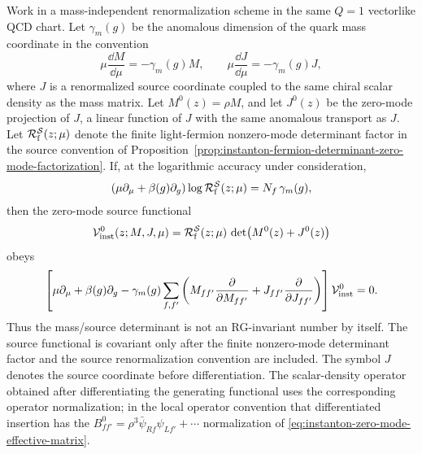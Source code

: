 \begin{proposition}
\label{prop:instanton-mass-source-rg-transport}
Work in a mass-independent renormalization scheme in the same \(Q=1\)
vectorlike QCD chart.  Let \(\gamma_m(g)\) be the anomalous dimension of the
quark mass coordinate in the convention
\begin{equation}
  \mu\frac{\dd M}{\dd\mu}=-\gamma_m(g)M,
  \qquad
  \mu\frac{\dd J}{\dd\mu}=-\gamma_m(g)J,
  \label{eq:instanton-mass-source-running}
\end{equation}
where \(J\) is a renormalized source coordinate coupled to the same chiral
scalar density as the mass matrix.  Let \(M^0(z)=\rho M\), and let
\(J^0(z)\) be the zero-mode projection of \(J\), a linear function of \(J\)
with the same anomalous transport as \(J\).  Let
\(\mathcal R_{\rm f}^{\mathcal S}(z;\mu)\) denote the finite light-fermion
nonzero-mode determinant factor in the source convention of
Proposition~\ref{prop:instanton-fermion-determinant-zero-mode-factorization}.
If, at the logarithmic accuracy under consideration,
\begin{equation}
  \left(\mu\partial_\mu+\beta(g)\partial_g\right)
  \log \mathcal R_{\rm f}^{\mathcal S}(z;\mu)
  =
  N_f\,\gamma_m(g),
  \label{eq:instanton-fermion-factor-mass-anomalous-rge}
\end{equation}
then the zero-mode source functional
\begin{equation}
  \mathcal V_{\rm inst}^{0}(z;M,J,\mu)
  =
  \mathcal R_{\rm f}^{\mathcal S}(z;\mu)\,
  \det\!\left(M^0(z)+J^0(z)\right)
  \label{eq:instanton-renormalized-source-functional}
\end{equation}
obeys
\begin{equation}
  \left[
    \mu\partial_\mu+\beta(g)\partial_g
    -\gamma_m(g)
    \sum_{f,f'}
    \left(
      M_{ff'}\frac{\partial}{\partial M_{ff'}}
      +J_{ff'}\frac{\partial}{\partial J_{ff'}}
    \right)
  \right]
  \mathcal V_{\rm inst}^{0}
  =
  0 .
  \label{eq:instanton-source-functional-rge}
\end{equation}
Thus the mass/source determinant is not an RG-invariant number by itself.
The source functional is covariant only after the finite nonzero-mode
determinant factor and the source renormalization convention are included.
The symbol \(J\) denotes the source coordinate before differentiation.  The
scalar-density operator obtained after differentiating the generating
functional uses the corresponding operator normalization; in the local
operator convention that differentiated insertion has the
\(B^0_{ff'}=\rho^3\bar\psi_{Rf}\psi_{Lf'}+\cdots\) normalization of
\eqref{eq:instanton-zero-mode-effective-matrix}.


\end{proposition}
